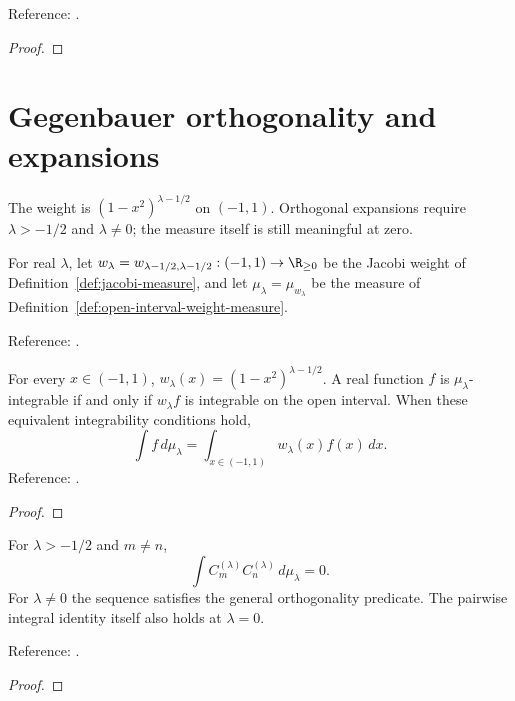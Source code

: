 \begin{supporting}
\begin{theorem}
Reference: \cite[5.2.8 and 15.2.1]{dlmf}.
\end{theorem}
\begin{proof}
\leanok
\end{proof}

\end{supporting}

\section{Gegenbauer orthogonality and expansions}\label{sec:textbook-classical-gegenbauer-integrals}

The weight is $(1-x^2)^{\lambda-1/2}$ on $(-1,1)$. Orthogonal expansions require $\lambda>-1/2$ and $\lambda\ne0$; the measure itself is still meaningful at zero.

\begin{definition}
\label{def:gegenbauer-measure}
\leanok
For real $\lambda$, let $w_\lambda=w_{\lambda-1/2,\lambda-1/2}:(-1,1)\to\R_{\ge0}$
be the Jacobi weight of Definition~\ref{def:jacobi-measure}, and let
$\mu_\lambda=\mu_{w_\lambda}$ be the measure of
Definition~\ref{def:open-interval-weight-measure}.

Reference: \cite[Table 18.3.1]{dlmf}.
\end{definition}

\begin{theorem}
\label{thm:gegenbauer-measure-characterisation}
\leanok
For every $x\in(-1,1)$, $w_\lambda(x)=(1-x^2)^{\lambda-1/2}$. A real function $f$ is $\mu_\lambda$-integrable if and only if
$w_\lambda f$ is integrable on the open interval. When these equivalent integrability conditions hold,
\[
 \int f\,d\mu_\lambda=\int_{x\in(-1,1)}w_\lambda(x)f(x)\,dx.
\]
Reference: \cite[Table 18.3.1]{dlmf}.
\end{theorem}
\begin{proof}
\leanok
\end{proof}

\begin{theorem}
\label{thm:gegenbauer-orthogonal}
\leanok
For $\lambda>-1/2$ and $m\ne n$,
\[\int C_m^{(\lambda)}C_n^{(\lambda)}\,d\mu_\lambda=0.\]
For $\lambda\ne0$ the sequence satisfies the general orthogonality predicate.
The pairwise integral identity itself also holds at $\lambda=0$.

Reference: \cite[Table 18.3.1]{dlmf}.
\end{theorem}
\begin{proof}
\leanok
\end{proof}

